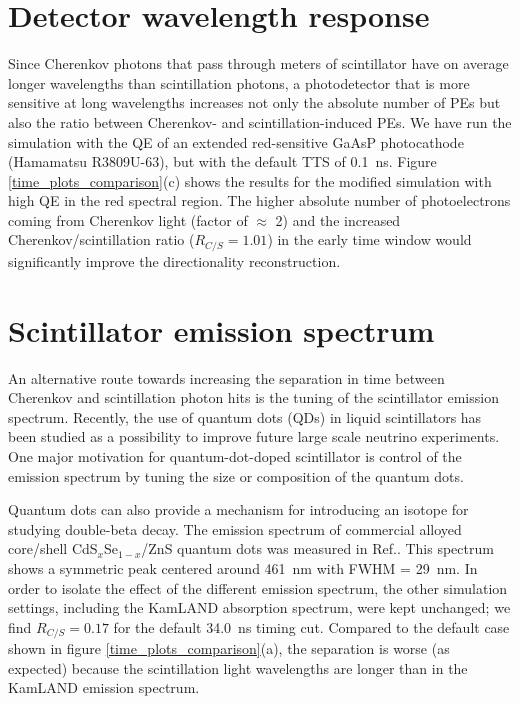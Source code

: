 \documentclass[cits]{JINST}
\begin{document}
\section{Detector wavelength response}
\label{detector_wavelength_response_sec} 
Since Cherenkov photons that pass through meters of
scintillator have on average longer wavelengths than scintillation
photons, a photodetector that is more sensitive at long wavelengths
increases not only the absolute number of PEs but also the ratio
between Cherenkov- and scintillation-induced PEs. We have run the simulation with the QE of an extended red-sensitive
GaAsP photocathode (Hamamatsu R3809U-63)\cite{Hamamatsu_R3899U}, but with the default TTS of 0.1~ns.
Figure \ref{time_plots_comparison}(c) shows the results for the
modified simulation with high QE in the red spectral region. The
higher absolute number of photoelectrons coming from Cherenkov light
(factor of $\approx$ 2) and the increased Cherenkov/scintillation
ratio ($R_{C/S}=1.01$) in the early time window would significantly improve the
directionality reconstruction.

\section{Scintillator emission spectrum}
\label{scintillator_emission_sec}
An alternative route towards increasing the separation in time between
Cherenkov and scintillation photon hits is the tuning of the
scintillator emission spectrum. Recently, the use of quantum dots
(QDs) in liquid scintillators has been studied as a possibility to
improve future large scale neutrino experiments\cite{qdot,qdot2}. One
major motivation for quantum-dot-doped scintillator is control of the
emission spectrum by tuning the size or composition of the quantum
dots. 

Quantum dots can also provide a mechanism for introducing an 
isotope for studying double-beta decay. The emission spectrum of commercial alloyed core/shell
CdS$_x$Se$_{1-x}$/ZnS quantum dots was measured in
Ref.\cite{qdot2}. This spectrum shows a symmetric peak centered
around 461~nm with FWHM = 29~nm.  In order to isolate the effect of
the different emission spectrum, the other simulation settings,
including the KamLAND absorption spectrum, were kept unchanged; we
find $R_{C/S}=0.17$ for the default 34.0~ns timing cut.  Compared to
the default case shown in figure \ref{time_plots_comparison}(a), the
separation is worse (as expected) because the scintillation light
wavelengths are longer than in the KamLAND emission spectrum.
\end{document}
